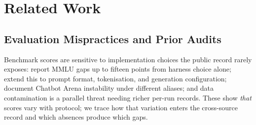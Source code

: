 \documentclass[11pt]{article}
\begin{document}
\section{Related Work}
\label{sec:related}
\subsection{Evaluation Mispractices and Prior Audits}

%


Benchmark scores are sensitive to implementation choices the public record rarely
exposes: \citet{alzahrani2024} report MMLU gaps up to fifteen points from harness
choice alone; \citet{biderman2024} extend this to prompt format, tokenisation, and
generation configuration; \citet{singh2025} document Chatbot Arena instability under
different aliases; and data contamination \citep{sainz2023} is a parallel threat
needing richer per-run records. These show \emph{that} scores vary with protocol; we
trace how that variation enters the cross-source record and which absences produce
which gaps.
\end{document}
